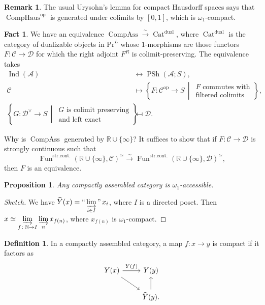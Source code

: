 \documentclass[draft]{amsart}
\newcommand{\NN}{\mathbb{N}}
\newcommand{\RR}{\mathbb{R}}
\newcommand{\set}[2]{\left\{#1\,\middle|\,#2\right\}}
\newcommand{\wh}[1]{\widehat{#1}}
\newcommand{\cat}[1]{\mathcal{#1}}
\newcommand{\op}{\mathrm{op}}
\newcommand{\isoto}{\mathbin{\xrightarrow{\sim}}}
\renewcommand{\Pr}{\mathrm{Pr}}
\DeclareMathOperator{\Ind}{Ind}
\DeclareMathOperator{\Cat}{Cat}
\DeclareMathOperator{\CompAss}{CompAss}
\DeclareMathOperator{\Fun}{Fun}
\DeclareMathOperator{\CompHaus}{CompHaus}
\DeclareMathOperator{\PSh}{PSh}
\DeclareMathOperator*{\indinjlim}{\text{``}\varinjlim\text{''}} %
\newtheorem{prop}[thm]{Proposition}
\theoremstyle{definition}
\newtheorem{defn}[thm]{Definition}
\newtheorem{rem}[thm]{Remark}
\newtheorem{fact}[thm]{Fact}
\begin{document}
\begin{rem}
The usual Urysohn's lemma for compact Hausdorff spaces says that $\CompHaus^\op$ is generated under colimits by $[0,1]$, which is $\omega_1$-compact.
\end{rem}

\begin{fact}
We have an equivalence
$\CompAss \isoto \Cat^{\mathrm{dual}}$, where $\Cat^{\mathrm{dual}}$ is the category of dualizable objects in $\Pr^L$ whose $1$-morphisms are those functors $F\colon \cat C\to \cat D$ for which the right adjoint $F^R$ is colimit-preserving. The equivalence takes
\begin{align*}
\Ind(\cat A) &\leftrightarrow \PSh(\cat A; S), \\
\cat C &\mapsto \set{F\colon \cat C^\op \to S}{\begin{array}{l}\text{$F$ commutes with} \\ \text{filtered colimits}\end{array}}, \\
\set{G\colon \cat D^\vee \to S}{\begin{array}{l}\text{$G$ is colimit preserving} \\ \text{and left exact}\end{array}} &\mapsfrom \cat D.
\end{align*}
\end{fact}

Why is $\CompAss$ generated by $\RR\cup \{\infty\}$? It suffices to show that if $F\colon \cat C\to \cat D$ is strongly continuous such that
\[
\Fun^{\mathrm{str.cont.}}(\RR\cup \{\infty\}, \cat C)^{\simeq} \isoto \Fun^{\mathrm{str.cont.}}(\RR\cup \{\infty\}, \cat D)^{\simeq},
\]
then $F$ is an equivalence.

\begin{prop}
Any compactly assembled category is $\omega_1$-accessible.
\end{prop}
\begin{proof}[Sketch]
We have $\wh{Y}(x) = \indinjlim\limits_{i\in I} x_i$, where $I$ is a directed poset. Then $x\simeq \varinjlim\limits_{f\colon \NN\to I} \varinjlim\limits_{n} x_{f(n)}$, where $x_{f(n)}$ is $\omega_1$-compact.
\end{proof}

\begin{defn}
In a compactly assembled category, a map $f\colon x\to y$ is compact if it factors as
\[
\begin{tikzcd}
Y(x)\ar[r,"Y(f)"] \ar[dr] & Y(y) \\
& \wh{Y}(y)\ar[u].
\end{tikzcd}
\]
\end{defn}
\end{document}

